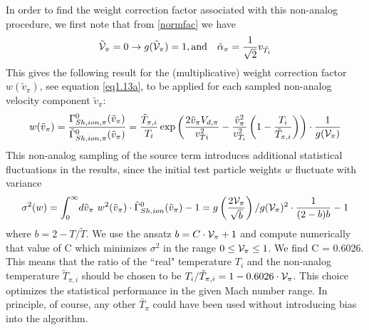 In order to find the weight correction factor associated with this non-analog
procedure, we first note that from \cref{normfac} we have
\begin{displaymath}{\tilde{\cal V}}_{\pi} = 0 \rightarrow g({\tilde{\cal V}}_{\pi}) =1, \mbox{and}
  \quad \tilde{\alpha}_{\pi} = \frac{1}{\sqrt{2}}v_{\tilde{T_i}}
\end{displaymath}
This gives the following result for the (multiplicative)
weight correction factor $w ( \tilde{v}_{\pi} )$, see equation \cref{eq1.13a},
to be applied for each sampled non-analog velocity component $\tilde v_\pi$:
\begin{equation}
  w ( \tilde{v}_{\pi} ) = \frac{\Gamma^0_{Sh,ion,\pi}
  ( {\tilde{v}}_{\pi} )}{\tilde{\Gamma}^0_{Sh,ion,\pi} ( \tilde{v}_{\pi} )} =
  \frac{\tilde{T}_{\pi,i}}{T_i} \exp \left (  \frac{2 \tilde{v}_{\pi}  V_{d, \pi}}{v_{Ti}^2}    - \frac {{\tilde{v}_{\pi}}^2}{v_{T_i}^2} \left ( 1	 -
  \frac{T_i}{{\tilde{T}_{\pi,i}}}  \right ) \right ) \cdot  \frac {1}{g({\cal
        V}_{\pi})} \label{eq1.28}
\end{equation}
This non-analog sampling of the source
term introduces additional statistical fluctuations in the results, since the
initial test particle weights $w$ fluctuate with variance
\begin{equation}
  \sigma^2(w) = \int_{0}^{\infty} \! d \tilde{v}_{\pi} \ w^2 ( {\tilde{v}}_{\pi}
  )  \cdot \tilde{\Gamma}^0_{Sh,ion} ( \tilde{v}_{\pi} ) - 1 = g \left (
  \frac{2{\cal V}_{\pi}}{\sqrt{b}} \right ) / g({\cal V}_{\pi})^2 \cdot
  \frac{1}{(2-b)	 b}   -   1 \label{eq1.29}
\end{equation}
where $b = 2	 -  T /
  {\tilde{T}}$.
We use the ansatz $b = C  \cdot   {\cal V}_{\pi} + 1$ and compute numerically
that value of C which minimizes $\sigma^2$ in the range $0 \le {\cal V}_{\pi}
  \le 1$.
We find C = 0.6026.
This means that the ratio of the ``real" temperature $T_i$ and the non-analog
temperature $\tilde{T}_{\pi,i}$ should be chosen to be $ T_{i} /
  {\tilde{T}_{\pi,i}} = 1 - 0.6026  \cdot {\cal V}_{\pi}$.
This choice optimizes the statistical performance in the given Mach number
range.
In principle, of course, any other $\tilde{T_{\pi}} $ could have been used
without introducing bias into the algorithm.

